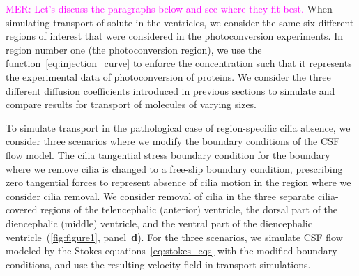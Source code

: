 \documentclass[fleqn]{wlscirep}
\newcommand{\Gs}{\Gamma_{s}}
\newcommand{\Gc}{\Gamma_{c}}
\newcommand{\Gp}{\Gamma_{p}}
\newcommand{\nn}{\mathbf{n}}
\newcommand{\uu}{\mathbf{u}}
\newcommand{\bsig}{\bm{\sigma}}
\newcommand{\bsigpar}{\hat{\bsig}_{\parallel}}
\newcommand{\btau}{\bm{\tau}}
\newcommand{\mer}[1]{\textcolor{magenta}{#1}}
\begin{document}

\mer{MER: Let's discuss the paragraphs below and see where they fit best.}
When simulating transport of solute in the ventricles, we consider the same six different regions of interest that were considered in the photoconversion experiments. In region number one (the photoconversion region), we use the function~\eqref{eq:injection_curve} to enforce the concentration such that it represents the experimental data of photoconversion of proteins. We consider the three different diffusion coefficients introduced in previous sections to simulate and compare results for transport of molecules of varying sizes.

To simulate transport in the pathological case of region-specific cilia absence, we consider three scenarios where we modify the boundary conditions of the CSF flow model. The cilia tangential stress boundary condition for the boundary where we remove cilia is changed to a free-slip boundary condition, prescribing zero tangential forces to represent absence of cilia motion in the region where we consider cilia removal. We consider removal of cilia in the three separate cilia-covered regions of the telencephalic (anterior) ventricle, the dorsal part of the diencephalic (middle) ventricle, and the ventral part of the diencephalic ventricle~(\cref{fig:figure1}, panel~\textbf{d}). For the three scenarios, we simulate CSF flow modeled by the Stokes equations~\eqref{eq:stokes_eqs} with the modified boundary conditions, and use the resulting velocity field in transport simulations.
\end{document}
